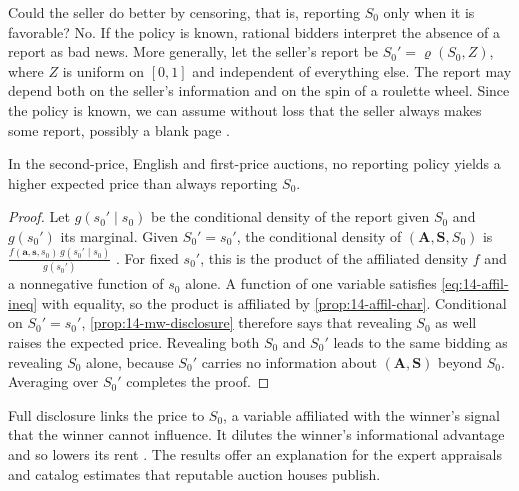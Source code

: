 Could the seller do better by censoring, that is, reporting $S_0$ only when it is favorable? No. If the policy
is known, rational bidders interpret the absence of a report as bad news. More generally, let the seller's
report be $S_0'=\varrho(S_0,Z)$, where $Z$ is uniform on $[0,1]$ and independent of everything else. The
report may depend both on the seller's information and on the spin of a roulette wheel. Since the policy is
known, we can assume without loss that the seller always makes some report, possibly a blank page
\citep[p.~1103]{MilgromWeber1982}.

\begin{proposition}\label{prop:14-mw-fullreport}
In the second-price, English and first-price auctions, no reporting policy yields a higher expected price
than always reporting $S_0$.
\end{proposition}

\begin{proof}
Let $g(s_0'\mid s_0)$ be the conditional density of the report given $S_0$ and $g(s_0')$ its marginal. Given
$S_0'=s_0'$, the conditional density of $(\bm A,\bm S,S_0)$ is
$\frac{f(\bm a,\bm s,s_0)\,g(s_0'\mid s_0)}{g(s_0')}$ \citep[footnote~19]{MilgromWeber1982}. For fixed
$s_0'$, this is the product of the affiliated density $f$ and a nonnegative function of $s_0$ alone. A function
of one variable satisfies \eqref{eq:14-affil-ineq} with equality, so the product is affiliated by
\cref{prop:14-affil-char}. Conditional on $S_0'=s_0'$, \cref{prop:14-mw-disclosure} therefore says that
revealing $S_0$ as well raises the expected price. Revealing both $S_0$ and $S_0'$ leads to the same bidding as
revealing $S_0$ alone, because $S_0'$ carries no information about $(\bm A,\bm S)$ beyond $S_0$. Averaging over
$S_0'$ completes the proof.
\end{proof}

Full disclosure links the price to $S_0$, a variable affiliated with the winner's signal that the winner
cannot influence. It dilutes the winner's informational advantage and so lowers its rent
\citep[p.~1117]{MilgromWeber1982}. The results offer an explanation for the expert appraisals and catalog
estimates that reputable auction houses publish.

